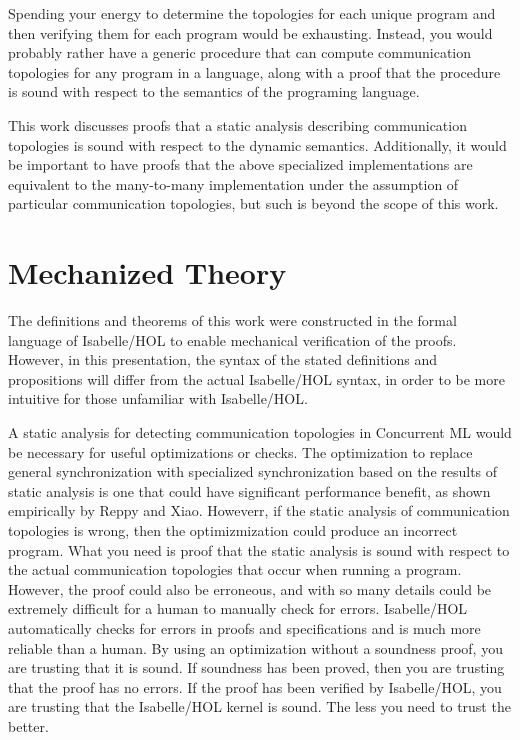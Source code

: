 \documentclass[letterpaper, 11pt]{extarticle}
\begin{document}
Spending your energy to determine the topologies for each unique program and then verifying
them for each program would be exhausting. Instead, you would probably rather have a generic
procedure that can compute communication topologies for any program in a language, along with
a proof that the procedure is sound with respect to the semantics of the programing language.

This work discusses proofs that a static analysis describing communication topologies is
sound with respect to the dynamic semantics.
Additionally, it would be important to have proofs that the above specialized
implementations are equivalent to the many-to-many implementation under the assumption of
particular communication topologies, but such is beyond the scope of this work.

\section{Mechanized Theory}

The definitions and theorems of this work were constructed in the formal
language of Isabelle/HOL to enable mechanical verification of the proofs.
However, in this presentation, the syntax of the stated definitions and propositions will differ from
the actual Isabelle/HOL syntax, in order to be more intuitive for those unfamiliar with Isabelle/HOL.

A static analysis for detecting communication topologies in Concurrent ML would be necessary for useful
optimizations or checks. The optimization to replace general synchronization with specialized synchronization
based on the results of static analysis is one that could have significant performance benefit, as shown
empirically by Reppy and Xiao. Howeverr, if the static analysis of communication topologies is wrong, then
the optimizmization could produce an incorrect program. What you need is proof that the static analysis is sound
with respect to the actual communication topologies that occur when running a program. However, the proof could also be
erroneous, and with so many details could be extremely difficult for a human to manually check for errors.
Isabelle/HOL automatically checks for errors in proofs and specifications and is much more reliable than a
human. By using an optimization without a soundness proof, you are trusting that it is sound. If soundness has
been proved, then you are trusting that the proof has no errors. If the proof has been verified by Isabelle/HOL, 
you are trusting that the Isabelle/HOL kernel is sound. The less you need to trust the better.
\end{document}
